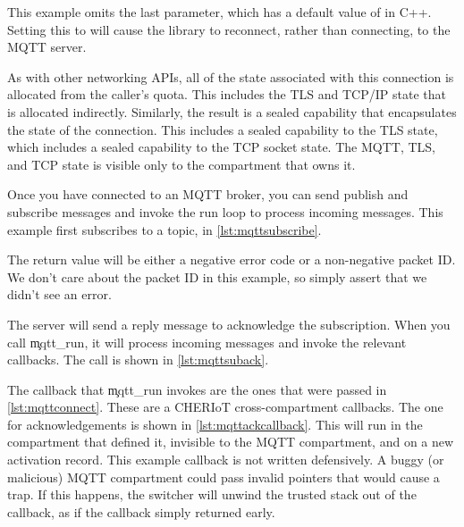 This example omits the last parameter, which has a default value of  in C++.
Setting this to  will cause the library to reconnect, rather than connecting, to the MQTT server.

\codelisting[filename=examples/mqtt/mqtt.cc,marker=connect,label=lst:mqttconnect,caption="Connecting to an MQTT broker."]{}

As with other networking APIs, all of the state associated with this connection is allocated from the caller's quota.
This includes the TLS and TCP/IP state that is allocated indirectly.
Similarly, the result is a sealed capability that encapsulates the state of the connection.
This includes a sealed capability to the TLS state, which includes a sealed capability to the TCP socket state.
The MQTT, TLS, and TCP state is visible only to the compartment that owns it.

Once you have connected to an MQTT broker, you can send publish and subscribe messages and invoke the run loop to process incoming messages.
This example first subscribes to a topic, in \ref{lst:mqttsubscribe}.

\codelisting[filename=examples/mqtt/mqtt.cc,marker=subscribe,label=lst:mqttsubscribe,caption="Subscribing to an MQTT topic."]{}

The return value will be either a negative error code or a non-negative packet ID.
We don't care about the packet ID in this example, so simply assert that we didn't see an error.


The server will send a reply message to acknowledge the subscription.
When you call \c{mqtt_run}, it will process incoming messages and invoke the relevant callbacks.
The call is shown in \ref{lst:mqttsuback}.

\codelisting[filename=examples/mqtt/mqtt.cc,marker=suback,label=lst:mqttsuback,caption="Waiting for acknowledgement after subscribing to an MQTT topic."]{}

The callback that \c{mqtt_run} invokes are the ones that were passed in \ref{lst:mqttconnect}.
These are a CHERIoT cross-compartment callbacks.
The one for acknowledgements is shown in \ref{lst:mqttackcallback}.
This will run in the compartment that defined it, invisible to the MQTT compartment, and on a new  activation record.
This example callback is not written defensively.
A buggy (or malicious) MQTT compartment could pass invalid pointers that would cause a trap.
If this happens, the switcher will unwind the trusted stack out of the callback, as if the callback simply returned early.

